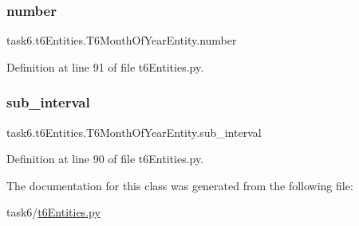 \subsubsection{\texorpdfstring{number}{number}}
{\footnotesize\ttfamily task6.\+t6\+Entities.\+T6\+Month\+Of\+Year\+Entity.\+number}



Definition at line 91 of file t6\+Entities.\+py.

\mbox{\label{classtask6_1_1t6Entities_1_1T6MonthOfYearEntity_ac2823d70e532c8032939f67a84c5efbc}} 
\subsubsection{\texorpdfstring{sub\+\_\+interval}{sub\_interval}}
{\footnotesize\ttfamily task6.\+t6\+Entities.\+T6\+Month\+Of\+Year\+Entity.\+sub\+\_\+interval}



Definition at line 90 of file t6\+Entities.\+py.



The documentation for this class was generated from the following file\+:\begin{DoxyCompactItemize}
\item 
task6/\hyperlink{t6Entities_8py}{t6\+Entities.\+py}\end{DoxyCompactItemize}
